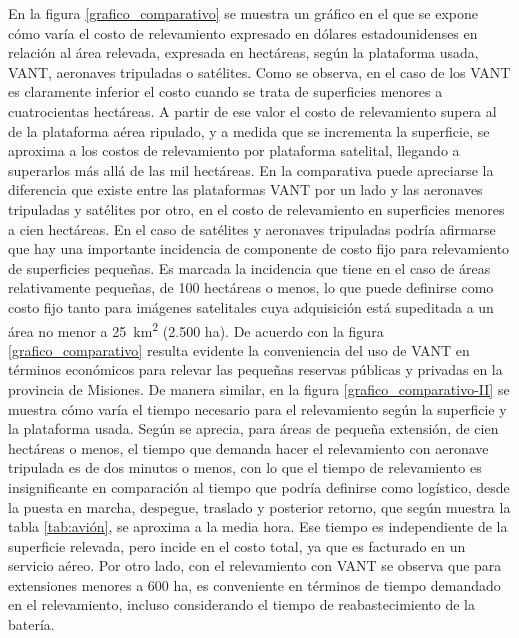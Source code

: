En la figura \ref{grafico_comparativo} se muestra un gráfico en el que se expone cómo varía el costo de relevamiento expresado en dólares estadounidenses en relación al área relevada, expresada en hectáreas, según la plataforma usada, VANT, aeronaves tripuladas o satélites. Como se observa, en el caso de los VANT es claramente inferior el costo cuando se trata de superficies menores a cuatrocientas hectáreas. A partir de ese valor el costo de relevamiento supera al de la plataforma aérea ripulado, y a medida que se incrementa la superficie, se aproxima a los costos de relevamiento por plataforma satelital, llegando a superarlos más allá de las mil hectáreas. En la comparativa puede apreciarse la diferencia que existe entre las plataformas VANT por un lado y las aeronaves tripuladas y satélites por otro, en el costo de relevamiento en superficies menores a cien hectáreas. En el caso de satélites y aeronaves tripuladas podría afirmarse que hay una importante incidencia de componente de costo fijo para relevamiento de superficies pequeñas. Es marcada la incidencia que tiene en el caso de áreas relativamente pequeñas, de 100 hectáreas o menos, lo que puede definirse como costo fijo tanto para imágenes satelitales cuya adquisición está supeditada a un área no menor a \SI{25}{\kilo\metre\squared} (2.500 ha). De acuerdo con la figura \ref{grafico_comparativo} resulta evidente la conveniencia del uso de VANT en términos económicos para relevar las pequeñas reservas públicas y privadas en la provincia de Misiones.
De manera similar, en la figura \ref{grafico_comparativo-II} se muestra cómo varía el tiempo necesario para el relevamiento según la superficie y la plataforma usada. Según se aprecia, para áreas de pequeña extensión, de cien hectáreas o menos, el tiempo que demanda hacer el relevamiento con aeronave tripulada es de dos minutos o menos, con lo que el tiempo de relevamiento es insignificante en comparación al tiempo que podría definirse como logístico, desde la puesta en marcha, despegue, traslado y posterior retorno, que según muestra la tabla \ref{tab:avión}, se aproxima a la media hora. Ese tiempo es independiente de la superficie relevada, pero incide en el costo total, ya que es facturado en un servicio aéreo. Por otro lado, con el relevamiento con VANT se observa que para extensiones menores a 600 ha, es conveniente en términos de tiempo demandado en el relevamiento, incluso considerando el tiempo de reabastecimiento de la batería.
